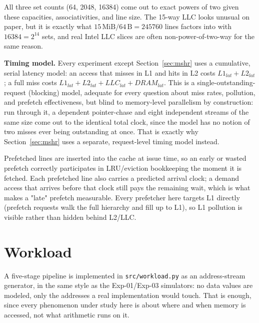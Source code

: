 \documentclass[11pt]{article}
\begin{document}
All three set counts (64, 2048, 16384) come out to exact powers of two given
these capacities, associativities, and line size. The 15-way LLC looks
unusual on paper, but it is exactly what $15\,\text{MiB}/64\,\text{B} =
245760$ lines factors into with $16384 = 2^{14}$ sets, and real Intel LLC
slices are often non-power-of-two-way for the same reason.

\textbf{Timing model.} Every experiment except Section~\ref{sec:mshr} uses a
cumulative, serial latency model: an access that misses in L1 and hits in L2
costs $L1_{lat}+L2_{lat}$; a full miss costs $L1_{lat}+L2_{lat}+LLC_{lat}+DRAM_{lat}$.
This is a single-outstanding-request (blocking) model, adequate for every
question about miss rates, pollution, and prefetch effectiveness, but blind
to memory-level parallelism by construction: run through it, a dependent
pointer-chase and eight independent streams of the same size come out to the
identical total clock, since the model has no notion of two misses ever
being outstanding at once. That is exactly why Section~\ref{sec:mshr} uses a
separate, request-level timing model instead.

Prefetched lines are inserted into the cache at issue time, so an early or
wasted prefetch correctly participates in LRU/eviction bookkeeping the
moment it is fetched. Each prefetched line also carries a predicted arrival
clock; a demand access that arrives before that clock still pays the
remaining wait, which is what makes a "late" prefetch measurable. Every
prefetcher here targets L1 directly (prefetch requests walk the full
hierarchy and fill up to L1), so L1 pollution is visible rather than hidden
behind L2/LLC.

\section{Workload}

A five-stage pipeline is implemented in \texttt{src/workload.py} as an
address-stream generator, in the same style as the Exp-01/Exp-03
simulators: no data values are modeled, only the addresses a real
implementation would touch. That is enough, since every phenomenon under
study here is about where and when memory is accessed, not what arithmetic
runs on it.
\end{document}
